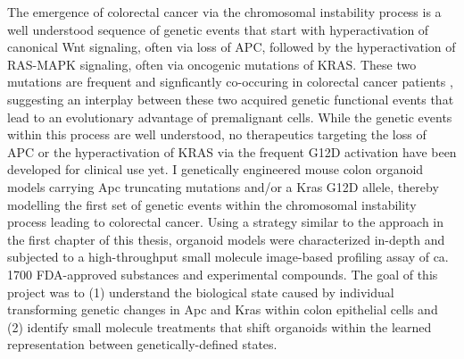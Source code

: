 \begin{flushleft}
The emergence of colorectal cancer via the chromosomal instability process is a well understood sequence of genetic events that start with hyperactivation of canonical Wnt signaling, often via loss of APC, followed by the hyperactivation of RAS-MAPK signaling, often via oncogenic mutations of KRAS. These two mutations are frequent and signficantly co-occuring in colorectal cancer patients \cite{Schell2016-ew}, suggesting an interplay between these two acquired genetic functional events that lead to an evolutionary advantage of premalignant cells. While the genetic events within this process are well understood, no therapeutics targeting the loss of APC or the hyperactivation of KRAS via the frequent G12D activation have been developed for clinical use yet. I genetically engineered mouse colon organoid models carrying Apc truncating mutations and/or a Kras G12D allele, thereby modelling the first set of genetic events within the chromosomal instability process leading to colorectal cancer. Using a strategy similar to the approach in the first chapter of this thesis, organoid models were characterized in-depth and subjected to a high-throughput small molecule image-based profiling assay of ca. 1700 FDA-approved substances and experimental compounds. The goal of this project was to (1) understand the biological state caused by individual transforming genetic changes in Apc and Kras within colon epithelial cells and (2) identify small molecule treatments that shift organoids within the learned representation between genetically-defined states. 


\end{flushleft}
